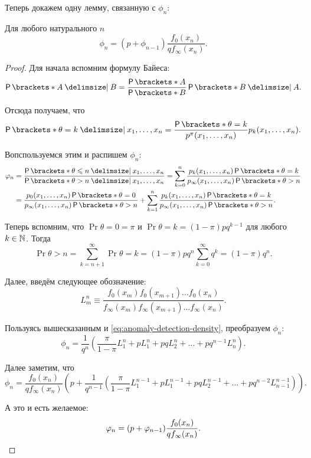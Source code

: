 Теперь докажем одну лемму, связанную с \(\phi_{n}\):
\begin{lemma}
	Для любого натурального \(n\)
	\[
		\phi_{n} 
		= (p + \phi_{n - 1})\frac{f_{0}(x_{n})}{q f_{\infty}(x_{n})}.
	\]
\end{lemma}
\begin{proof}
	Для начала вспомним формулу Байеса:
	\[
		\Pr{A \given B} = \frac{\Pr{A}}{\Pr{B}}\Pr{B \given A}.
	\]
	
	Отсюда получаем, что
	\[
		\Pr{\theta = k \given x_{1}, \ldots, x_{n}} = \frac{\Pr{\theta = k}}{p^{\pi}(x_{1}, \ldots, x_{n})}p_{k}(x_{1}, \ldots, x_{n}).
	\]
	
	Вопспользуемся этим и распишем \(\phi_{n}\):
	\begin{align*}
		\phi_{n}
		&= \frac{\Pr{\theta \leq n \given x_{1}, \ldots, x_{n}}}{\Pr{\theta > n \given x_{1}, \ldots, x_{n}}}
		= \sum_{k = 0}^{n} \frac{p_{k}(x_{1}, \ldots, x_{n})\Pr{\theta = k}}{p_{\infty}(x_{1}, \ldots, x_{n})\Pr{\theta > n}} \\
		&= \frac{p_{0}(x_{1}, \ldots, x_{n})\Pr{\theta = 0}}{p_{\infty}(x_{1}, \ldots, x_{n})\Pr{\theta > n}} 
		+ \sum_{k = 1}^{n} \frac{p_{k}(x_{1}, \ldots, x_{n})\Pr{\theta = k}}{p_{\infty}(x_{1}, \ldots, x_{n})\Pr{\theta > n}}.
	\end{align*}
	
	Теперь вспомним, что \(\Pr{\theta = 0} = \pi\) и \(\Pr{\theta = k} = (1 - \pi)pq^{k - 1}\) для любого \(k \in \N\). Тогда 
	\[
		\Pr{\theta > n} 
		= \sum_{k = n + 1}^{\infty} \Pr{\theta = k} 
		= (1 - \pi)pq^{n}\sum_{k = 0}^{\infty} q^{k} 
		= (1 - \pi)q^{n}.
	\]
	
	Далее, введём следующее обозначение:
	\[
		L_{m}^{n} 
		\equiv \frac{f_{0}(x_{m}) f_{0}(x_{m + 1}) \ldots f_{0}(x_{n})}{f_{\infty}(x_{m}) f_{\infty}(x_{m + 1}) \ldots f_{\infty}(x_{n})}.
	\]
	
	Пользуясь вышесказанным и \eqref{eq:anomaly-detection-density}, преобразуем \(\phi_{n}\):
	\[
		\phi_{n}
		= \frac{1}{q^{n}}\left(\frac{\pi}{1 - \pi}L_{1}^{n} + pL_{1}^{n} + pqL_{2}^{n} + \ldots + pq^{n - 1}L_{n}^{n}\right).
	\]
	
	Далее заметим, что
	\[
		\phi_{n}
		= \frac{f_{0}(x_{n})}{qf_{\infty}(x_{n})}\left(p + \frac{1}{q^{n - 1}}\left(\frac{\pi}{1 - \pi}L_{1}^{n - 1} + pL_{1}^{n - 1} + pqL_{2}^{n - 1} + \ldots + pq^{n - 2}L_{n - 1}^{n - 1}\right)\right).
	\]
	
	А это и есть желаемое:
	\[
		\phi_{n}
		= (p + \phi_{n - 1})\frac{f_{0}(x_{n})}{qf_{\infty}(x_{n})}. \qedhere
	\]
\end{proof}

